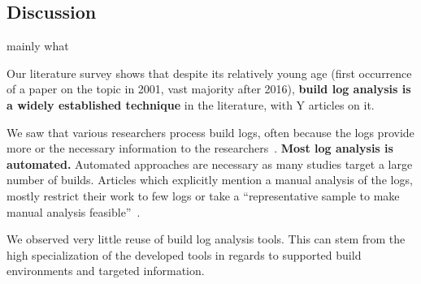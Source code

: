 \subsection{Discussion}
\label{sec:lit-sur:discussion}
mainly what

Our literature survey shows that despite its relatively young age
(first occurrence of a paper on the topic in 2001, vast majority after
2016), \textbf{build log analysis is a widely established technique}
in the literature, with Y articles on it.


We saw that various researchers process build logs, often because the
logs provide more or the necessary
information to the researchers~\cite{ren2018automated}.
\textbf{Most log analysis is automated.} Automated approaches are
necessary as many studies target a large
number of builds.
Articles
which explicitly mention a manual analysis of the logs, mostly
restrict their work to few logs or take a ``representative sample to
make manual analysis feasible''~\cite{zolfagharinia2017not}.

We observed very little reuse of build log analysis tools.
This can stem from the
high specialization of the developed tools in regards to supported
build environments and targeted information.

